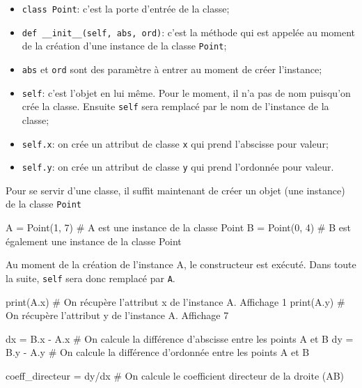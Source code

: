     \begin{itemize}
        \item \verb+class Point+: c'est la porte d'entrée de la classe;
        \item \verb+def __init__(self, abs, ord)+: c'est la méthode qui est appelée au moment de la création d'une instance de la classe \verb+Point+;
        \item \verb+abs+ et \verb+ord+ sont des paramètre à entrer au moment de créer l'instance;
        \item \verb+self+: c'est l'objet en lui même. Pour le moment, il n'a pas de nom puisqu'on crée la classe. Ensuite \verb+self+ sera remplacé par le nom de l'instance de la classe;
        \item \verb+self.x+: on crée un attribut de classe \verb+x+ qui prend l'abscisse pour valeur;
        \item \verb+self.y+: on crée un attribut de classe \verb+y+ qui prend l'ordonnée pour valeur.

    \end{itemize}

    
\begin{definition}{}
    
    Pour se servir d'une classe, il suffit maintenant de créer un objet (une instance) de la classe \verb+Point+

    \begin{CodePythontexAlt}[Largeur=1\linewidth,Centre,Lignes=true,PremLigne=1]{}
    A = Point(1, 7)     # A est une instance de la classe Point
    B = Point(0, 4)     # B est également une instance de la classe Point
\end{CodePythontexAlt}

Au moment de la création de l'instance A, le constructeur est exécuté. Dans toute la suite, \verb+self+ sera donc remplacé par \verb+A+.


\begin{CodePythontexAlt}[Largeur=1\linewidth,Centre,Lignes=true,PremLigne=1]{}
    print(A.x)     # On récupère l'attribut x de l'instance A. Affichage 1
    print(A.y)     # On récupère l'attribut y de l'instance A. Affichage 7

    dx = B.x - A.x    # On calcule la différence d'abscisse entre les points A et B
    dy = B.y - A.y    # On calcule la différence d'ordonnée entre les points A et B

    coeff_directeur = dy/dx   # On calcule le coefficient directeur de la droite (AB)
\end{CodePythontexAlt}

\end{definition}


